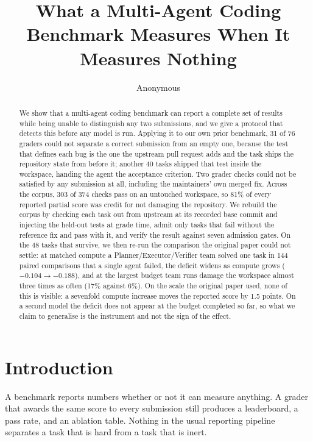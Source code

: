 \documentclass[11pt]{article}
\title{What a Multi-Agent Coding Benchmark Measures When It Measures Nothing}
\author{Anonymous}
\date{}
\begin{document}
\maketitle

\begin{abstract}
We show that a multi-agent coding benchmark can report a complete set of
results while being unable to distinguish any two submissions, and we give a
protocol that detects this before any model is run. Applying it to our own
prior benchmark, 31 of 76 graders could not separate a correct submission from
an empty one, because the test that defines each bug is the one the upstream
pull request adds and the task ships the repository state from before it;
another 40 tasks shipped that test inside the workspace, handing the agent the
acceptance criterion. Two grader checks could not be satisfied by any
submission at all, including the maintainers' own merged fix. Across the
corpus, 303 of 374 checks pass on an untouched workspace, so 81\% of every
reported partial score was credit for not damaging the repository. We rebuild
the corpus by checking each task out from upstream at its recorded base commit
and injecting the held-out tests at grade time, admit only tasks that fail
without the reference fix and pass with it, and verify the result against seven
admission gates. On the 48 tasks that survive, we then re-run the comparison the
original paper could not settle: at matched compute a Planner/Executor/Verifier
team solved one task in 144 paired comparisons that a single agent failed, the
deficit widens as compute grows ($-0.104 \to -0.188$), and at the largest budget
team runs damage the workspace almost three times as often (17\% against 6\%).
On the scale the original paper used, none of this is visible: a sevenfold
compute increase moves the reported score by 1.5 points. On a second model the
deficit does not appear at the budget completed so far, so what we claim to
generalise is the instrument and not the sign of the effect.
\end{abstract}

\section{Introduction}

A benchmark reports numbers whether or not it can measure anything. A grader
that awards the same score to every submission still produces a leaderboard, a
pass rate, and an ablation table. Nothing in the usual reporting pipeline
separates a task that is hard from a task that is inert.
\end{document}
